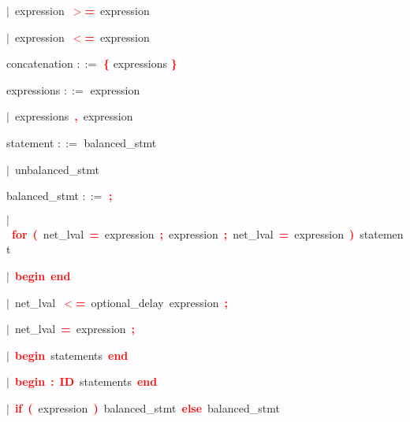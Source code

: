\mbox{$|$ expression \textbf{\textcolor{red}{$>$=}} expression}

\mbox{$|$ expression \textbf{\textcolor{red}{$<$=}} expression}

\vspace{1em}
\noindent
\settowidth{\parindent}{\hspace{4ex}}
concatenation $::=$\hspace{1ex} \textbf{\textcolor{red}{\textbf{\textcolor{red}{\{}}}} expressions \textbf{\textcolor{red}{\textbf{\textcolor{red}{\}}}}}

\vspace{1em}
\noindent
\settowidth{\parindent}{\hspace{4ex}}
expressions $::=$\hspace{1ex} expression

\mbox{$|$ expressions \textbf{\textcolor{red}{,}} expression}

\vspace{1em}
\noindent
\settowidth{\parindent}{\hspace{4ex}}
statement $::=$\hspace{1ex} balanced\_stmt

\mbox{$|$ unbalanced\_stmt}

\vspace{1em}
\noindent
\settowidth{\parindent}{\hspace{4ex}}
balanced\_stmt $::=$\hspace{1ex} \textbf{\textcolor{red}{;}}

\mbox{$|$ \textbf{\textcolor{red}{for}} \textbf{\textcolor{red}{(}} net\_lval \textbf{\textcolor{red}{=}} expression \textbf{\textcolor{red}{;}} expression \textbf{\textcolor{red}{;}} net\_lval \textbf{\textcolor{red}{=}} expression \textbf{\textcolor{red}{)}} statement}

\mbox{$|$ \textbf{\textcolor{red}{begin}} \textbf{\textcolor{red}{end}}}

\mbox{$|$ net\_lval \textbf{\textcolor{red}{$<$=}} optional\_delay expression \textbf{\textcolor{red}{;}}}

\mbox{$|$ net\_lval \textbf{\textcolor{red}{=}} expression \textbf{\textcolor{red}{;}}}

\mbox{$|$ \textbf{\textcolor{red}{begin}} statements \textbf{\textcolor{red}{end}}}

\mbox{$|$ \textbf{\textcolor{red}{begin}} \textbf{\textcolor{red}{:}} \textbf{\textcolor{red}{ID}} statements \textbf{\textcolor{red}{end}}}

\mbox{$|$ \textbf{\textcolor{red}{if}} \textbf{\textcolor{red}{(}} expression \textbf{\textcolor{red}{)}} balanced\_stmt \textbf{\textcolor{red}{else}} balanced\_stmt}

